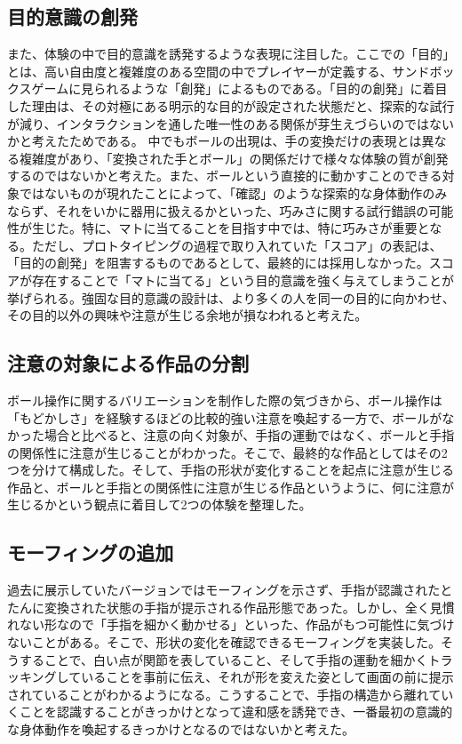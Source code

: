 \subsection{目的意識の創発}
また、体験の中で目的意識を誘発するような表現に注目した。ここでの「目的」とは、高い自由度と複雑度のある空間の中でプレイヤーが定義する、サンドボックスゲームに見られるような「創発」によるものである。「目的の創発」に着目した理由は、その対極にある明示的な目的が設定された状態だと、探索的な試行が減り、インタラクションを通した唯一性のある関係が芽生えづらいのではないかと考えたためである。
中でもボールの出現は、手の変換だけの表現とは異なる複雑度があり、「変換された手とボール」の関係だけで様々な体験の質が創発するのではないかと考えた。また、ボールという直接的に動かすことのできる対象ではないものが現れたことによって、「確認」のような探索的な身体動作のみならず、それをいかに器用に扱えるかといった、巧みさに関する試行錯誤の可能性が生じた。特に、マトに当てることを目指す中では、特に巧みさが重要となる。ただし、プロトタイピングの過程で取り入れていた「スコア」の表記は、「目的の創発」を阻害するものであるとして、最終的には採用しなかった。スコアが存在することで「マトに当てる」という目的意識を強く与えてしまうことが挙げられる。強固な目的意識の設計は、より多くの人を同一の目的に向かわせ、その目的以外の興味や注意が生じる余地が損なわれると考えた。

\subsection{注意の対象による作品の分割}
ボール操作に関するバリエーションを制作した際の気づきから、ボール操作は「もどかしさ」を経験するほどの比較的強い注意を喚起する一方で、ボールがなかった場合と比べると、注意の向く対象が、手指の運動ではなく、ボールと手指の関係性に注意が生じることがわかった。そこで、最終的な作品としてはその2つを分けて構成した。そして、手指の形状が変化することを起点に注意が生じる作品と、ボールと手指との関係性に注意が生じる作品というように、何に注意が生じるかという観点に着目して2つの体験を整理した。

\subsection{モーフィングの追加}
過去に展示していたバージョンではモーフィングを示さず、手指が認識されたとたんに変換された状態の手指が提示される作品形態であった。しかし、全く見慣れない形なので「手指を細かく動かせる」といった、作品がもつ可能性に気づけないことがある。そこで、形状の変化を確認できるモーフィングを実装した。そうすることで、白い点が関節を表していること、そして手指の運動を細かくトラッキングしていることを事前に伝え、それが形を変えた姿として画面の前に提示されていることがわかるようになる。こうすることで、手指の構造から離れていくことを認識することがきっかけとなって違和感を誘発でき、一番最初の意識的な身体動作を喚起するきっかけとなるのではないかと考えた。

